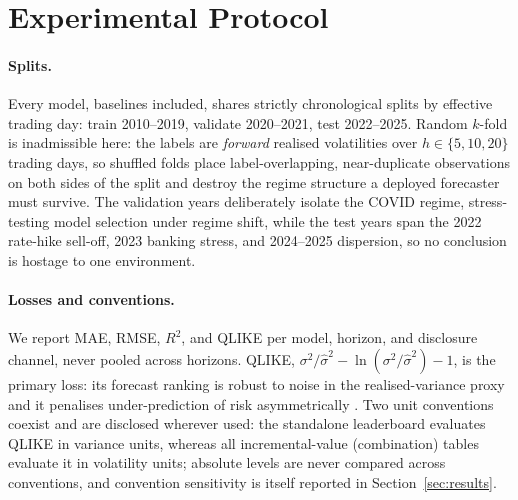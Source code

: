 \section{Experimental Protocol}
\label{sec:protocol}

\paragraph{Splits.}
Every model, baselines included, shares strictly chronological splits by effective trading day: train 2010--2019, validate 2020--2021, test 2022--2025. Random $k$-fold is inadmissible here: the labels are \emph{forward} realised volatilities over $h\in\{5,10,20\}$ trading days, so shuffled folds place label-overlapping, near-duplicate observations on both sides of the split and destroy the regime structure a deployed forecaster must survive. The validation years deliberately isolate the COVID regime, stress-testing model selection under regime shift, while the test years span the 2022 rate-hike sell-off, 2023 banking stress, and 2024--2025 dispersion, so no conclusion is hostage to one environment.

\paragraph{Losses and conventions.}
We report MAE, RMSE, $R^2$, and QLIKE per model, horizon, and disclosure channel, never pooled across horizons. QLIKE, $\sigma^2/\hat\sigma^2-\ln(\sigma^2/\hat\sigma^2)-1$, is the primary loss: its forecast ranking is robust to noise in the realised-variance proxy and it penalises under-prediction of risk asymmetrically \citep{patton2011proxies}. Two unit conventions coexist and are disclosed wherever used: the standalone leaderboard evaluates QLIKE in variance units, whereas all incremental-value (combination) tables evaluate it in volatility units; absolute levels are never compared across conventions, and convention sensitivity is itself reported in Section~\ref{sec:results}.

